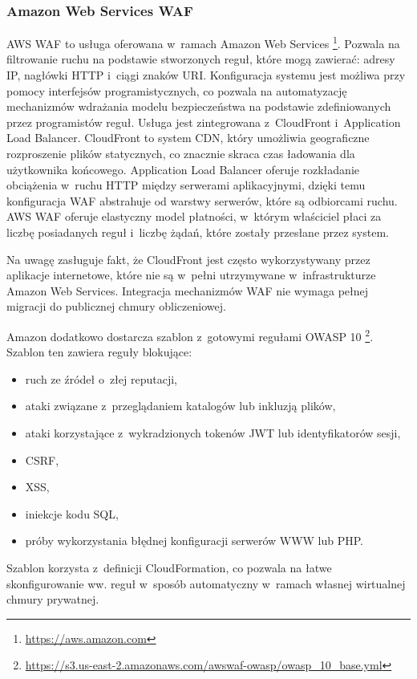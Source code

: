 \documentclass[12pt,a4paper,polish,thesis]{dcsbook}
\begin{document}
\subsubsection{Amazon Web Services WAF}
AWS WAF \cite{awswaf} to usługa oferowana w~ramach Amazon Web Services \footnote{\url{https://aws.amazon.com}}. Pozwala na filtrowanie ruchu na podstawie stworzonych reguł, które mogą zawierać: adresy IP, nagłówki HTTP i~ciągi znaków URI. Konfiguracja systemu jest możliwa przy pomocy interfejsów programistycznych, co pozwala na automatyzację mechanizmów wdrażania modelu bezpieczeństwa na podstawie zdefiniowanych przez programistów reguł. Usługa jest zintegrowana z~CloudFront i~Application Load Balancer. CloudFront to system CDN, który umożliwia geograficzne rozproszenie plików statycznych, co znacznie skraca czas ładowania dla użytkownika końcowego. Application Load Balancer oferuje rozkładanie obciążenia w~ruchu HTTP między serwerami aplikacyjnymi, dzięki temu konfiguracja WAF abstrahuje od warstwy serwerów, które są odbiorcami ruchu. AWS WAF oferuje elastyczny model płatności, w~którym właściciel płaci za liczbę posiadanych reguł i~liczbę żądań, które zostały przesłane przez system.

Na uwagę zasługuje fakt, że CloudFront jest często wykorzystywany przez aplikacje internetowe, które nie są w~pełni utrzymywane w~infrastrukturze Amazon Web Services. Integracja mechanizmów WAF nie wymaga pełnej migracji do publicznej chmury obliczeniowej.

Amazon dodatkowo dostarcza szablon z~gotowymi regułami OWASP 10 \footnote{\url{https://s3.us-east-2.amazonaws.com/awswaf-owasp/owasp_10_base.yml}}. Szablon ten zawiera reguły blokujące:
\begin{itemize}
\item ruch ze źródeł o~złej reputacji,
\item ataki związane z~przeglądaniem katalogów lub inkluzją plików,
\item ataki korzystające z~wykradzionych tokenów JWT lub identyfikatorów sesji,
\item CSRF,
\item XSS,
\item iniekcje kodu SQL,
\item próby wykorzystania błędnej konfiguracji serwerów WWW lub PHP.
\end{itemize}
Szablon korzysta z~definicji CloudFormation, co pozwala na łatwe skonfigurowanie ww. reguł w~sposób automatyczny w~ramach własnej wirtualnej chmury prywatnej.
\end{document}
